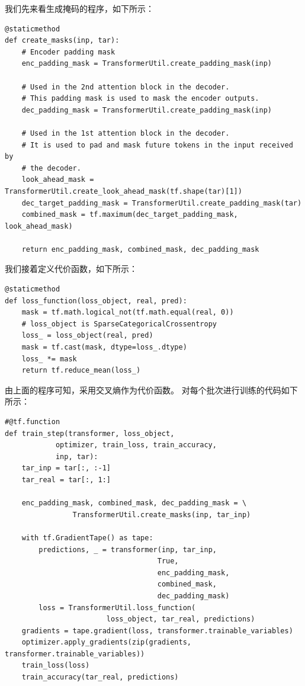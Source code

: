 \documentclass{article}
\begin{document}
我们先来看生成掩码的程序，如下所示：
\begin{lstlisting}
@staticmethod
def create_masks(inp, tar):
    # Encoder padding mask
    enc_padding_mask = TransformerUtil.create_padding_mask(inp)
    
    # Used in the 2nd attention block in the decoder.
    # This padding mask is used to mask the encoder outputs.
    dec_padding_mask = TransformerUtil.create_padding_mask(inp)
    
    # Used in the 1st attention block in the decoder.
    # It is used to pad and mask future tokens in the input received by 
    # the decoder.
    look_ahead_mask = TransformerUtil.create_look_ahead_mask(tf.shape(tar)[1])
    dec_target_padding_mask = TransformerUtil.create_padding_mask(tar)
    combined_mask = tf.maximum(dec_target_padding_mask, look_ahead_mask)
    
    return enc_padding_mask, combined_mask, dec_padding_mask
\end{lstlisting}
我们接着定义代价函数，如下所示：
\begin{lstlisting}
@staticmethod
def loss_function(loss_object, real, pred):
    mask = tf.math.logical_not(tf.math.equal(real, 0))
    # loss_object is SparseCategoricalCrossentropy
    loss_ = loss_object(real, pred)
    mask = tf.cast(mask, dtype=loss_.dtype)
    loss_ *= mask
    return tf.reduce_mean(loss_)
\end{lstlisting}
由上面的程序可知，采用交叉熵作为代价函数。\newline
对每个批次进行训练的代码如下所示：
\begin{lstlisting}
#@tf.function
def train_step(transformer, loss_object,
            optimizer, train_loss, train_accuracy,
            inp, tar):
    tar_inp = tar[:, :-1]
    tar_real = tar[:, 1:]
    
    enc_padding_mask, combined_mask, dec_padding_mask = \
                TransformerUtil.create_masks(inp, tar_inp)
    
    with tf.GradientTape() as tape:
        predictions, _ = transformer(inp, tar_inp, 
                                    True, 
                                    enc_padding_mask, 
                                    combined_mask, 
                                    dec_padding_mask)
        loss = TransformerUtil.loss_function(
                        loss_object, tar_real, predictions)
    gradients = tape.gradient(loss, transformer.trainable_variables)    
    optimizer.apply_gradients(zip(gradients, transformer.trainable_variables))
    train_loss(loss)
    train_accuracy(tar_real, predictions)
\end{lstlisting}
\end{document}

